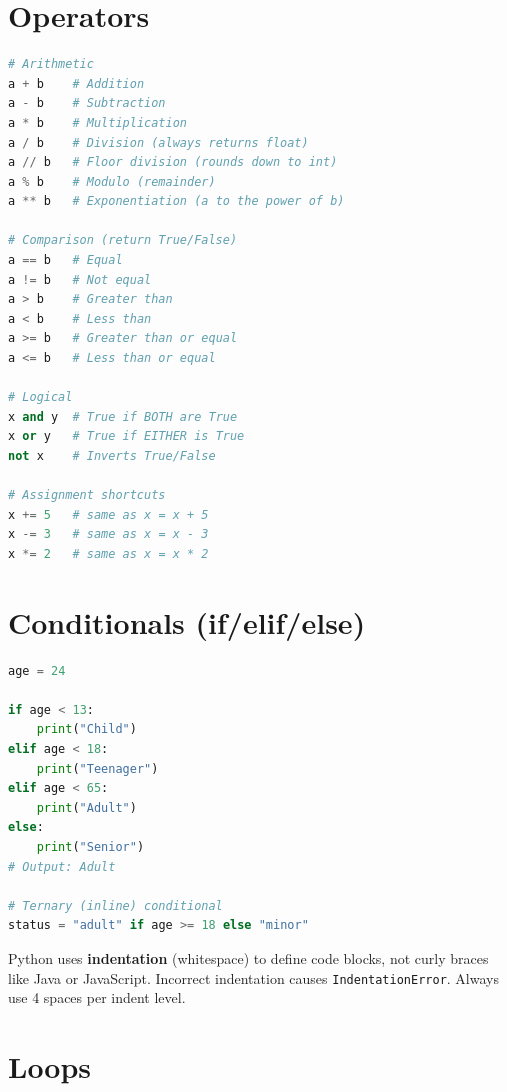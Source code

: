 \documentclass[12pt, a4paper, oneside]{book}
\begin{document}
\section{Operators}

\begin{lstlisting}[language=Python, caption={Python operators}]
# Arithmetic
a + b    # Addition
a - b    # Subtraction
a * b    # Multiplication
a / b    # Division (always returns float)
a // b   # Floor division (rounds down to int)
a % b    # Modulo (remainder)
a ** b   # Exponentiation (a to the power of b)

# Comparison (return True/False)
a == b   # Equal
a != b   # Not equal
a > b    # Greater than
a < b    # Less than
a >= b   # Greater than or equal
a <= b   # Less than or equal

# Logical
x and y  # True if BOTH are True
x or y   # True if EITHER is True
not x    # Inverts True/False

# Assignment shortcuts
x += 5   # same as x = x + 5
x -= 3   # same as x = x - 3
x *= 2   # same as x = x * 2
\end{lstlisting}

\section{Conditionals (if/elif/else)}

\begin{lstlisting}[language=Python, caption={Conditional statements}]
age = 24

if age < 13:
    print("Child")
elif age < 18:
    print("Teenager")
elif age < 65:
    print("Adult")
else:
    print("Senior")
# Output: Adult

# Ternary (inline) conditional
status = "adult" if age >= 18 else "minor"
\end{lstlisting}

\begin{warningbox}
Python uses \textbf{indentation} (whitespace) to define code blocks, not curly braces like Java or JavaScript. Incorrect indentation causes \texttt{IndentationError}. Always use 4 spaces per indent level.
\end{warningbox}

\section{Loops}
\end{document}
